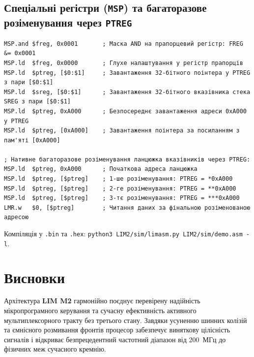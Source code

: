 \documentclass[11pt,a4paper]{article}
\begin{document}
\subsection{Спеціальні регістри (\texttt{MSP}) та багаторазове розіменування через \texttt{PTREG}}
\begin{verbatim}
MSP.and $freg, 0x0001       ; Маска AND на прапорцевий регістр: FREG &= 0x0001
MSP.ld  $freg, 0x0000       ; Глухе налаштування у регістр прапорців
MSP.ld  $ptreg, [$0:$1]     ; Завантаження 32-бітного поінтера у PTREG з пари [$0:$1]
MSP.ld  $sreg, [$0:$1]      ; Завантаження 32-бітного вказівника стека SREG з пари [$0:$1]
MSP.ld  $ptreg, 0xA000      ; Безпосереднє завантаження адреси 0xA000 у PTREG
MSP.ld  $ptreg, [0xA000]    ; Завантаження поінтера за посиланням з пам'яті [0xA000]

; Нативне багаторазове розіменування ланцюжка вказівників через PTREG:
MSP.ld  $ptreg, 0xA000      ; Початкова адреса ланцюжка
MSP.ld  $ptreg, [$ptreg]    ; 1-ше розіменування: PTREG = *0xA000
MSP.ld  $ptreg, [$ptreg]    ; 2-ге розіменування: PTREG = **0xA000
MSP.ld  $ptreg, [$ptreg]    ; 3-тє розіменування: PTREG = ***0xA000
LMR.w   $0, [$ptreg]        ; Читання даних за фінальною розіменованою адресою
\end{verbatim}
Компіляція у \texttt{.bin} та \texttt{.hex}: \texttt{python3 LIM2/sim/limasm.py LIM2/sim/demo.asm -l}.

\section{Висновки}
Архітектура \textbf{LIM M2} гармонійно поєднує перевірену надійність мікропрограмного керування та сучасну ефективність активного мультиплексорного тракту без третього стану. Завдяки усуненню шинних колізій та ємнісного розмивання фронтів процесор забезпечує виняткову цілісність сигналів і відкриває безпрецедентний частотний діапазон від 200~МГц до фізичних меж сучасного кремнію.
\end{document}
